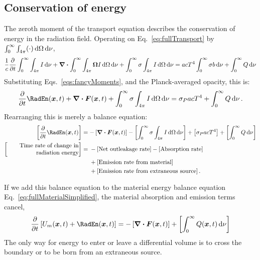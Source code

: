 \documentclass[11pt]{SRJresearch}
\begin{document}
\subsection{Conservation of energy}
The zeroth moment of the transport equation describes the conservation of
energy in the radiation field. Operating on Eq.~\eqref{eq:fullTransport} by
$\int_{0}^{\infty} \int_{4\pi} (\cdot) \mathop{}\!\mathrm{d} \Omega \mathop{}\!\mathrm{d} \nu$,
\begin{equation*}
  \frac{1}{c}\frac{\partial }{\partial t} \int_{0}^{\infty} \int_{4\pi}  I \mathop{}\!\mathrm{d} \nu
  + \bm{\nabla} \bm{\cdot} \int_{0}^{\infty} \int_{4\pi} \bm{\Omega}  I \mathop{}\!\mathrm{d} \Omega \mathop{}\!\mathrm{d} \nu
  + \int_{0}^{\infty} \sigma \int_{4\pi} I \mathop{}\!\mathrm{d} \Omega \mathop{}\!\mathrm{d} \nu
  = a c T^4 \int_{0}^{\infty} \sigma b \mathop{}\!\mathrm{d} \nu + \int_{0}^{\infty} Q \mathop{}\!\mathrm{d} \nu
\end{equation*}
Substituting Eqs.~\eqref{eqs:fancyMoments}, and the Planck-averaged opacity,
this is:
\begin{equation}\label{eq:fullConservation}
  \pder{}{t}\RadEn(\vec{x}, t)
  + \del \vd \vec{F}(\vec{x}, t)
  + \int_{0}^{\infty} \sigma \int_{4\pi} I \ud \Omega \ud \nu
  = \sigma_P a c T^4  + \int_{0}^{\infty} Q \ud \nu \,.
\end{equation}
Rearranging this is merely a balance equation:
\begin{align*}
  \left[ \pder{}{t}\RadEn(\vec{x}, t) \right]
  &= 
  - \left[ \del \vd \vec{F}(\vec{x}, t) \right]
  - \left[ \int_{0}^{\infty} \sigma \int_{4\pi} I \ud \Omega \ud \nu \right]
  + \left[ \sigma_P a c T^4 \right]
  + \left[ \int_{0}^{\infty} Q \ud \nu \right]
  \\
  \left[\parbox[c]{12em}{\raggedleft Time rate of change in
  radiation energy} \right]
  &= {}-{}[\text{Net outleakage rate}]- [\text{Absorption rate}]
  \\
  &\hphantom{ {}={}} + [\text{Emission rate from material}]
  \\
  &\hphantom{ {}={}} + [\text{Emission rate from extraneous source}] \,.
\end{align*}

If we add this balance equation to the material energy balance equation
Eq.~\eqref{eq:fullMaterialSimplified}, the material absorption and emission
terms cancel,
\begin{equation*}
  \pder{}{t} \left[ U_m(\vec{x}, t) + \RadEn(\vec{x}, t)  \right]
  = - \left[ \del \vd \vec{F}(\vec{x}, t) \right]
+ \left[ \int_{0}^{\infty} Q (\vec{x}, t) \ud \nu \right] 
\end{equation*} 
The only way for energy to enter or leave a differential volume is to cross the
boundary or to be born from an extraneous source.
\end{document}
